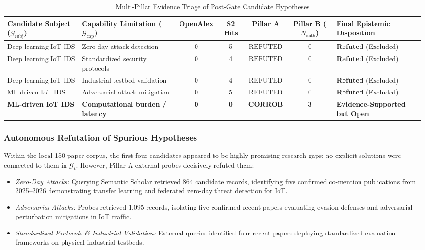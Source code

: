 \documentclass[conference,10pt]{IEEEtran}
\begin{document}
\begin{table}[t]
\caption{Multi-Pillar Evidence Triage of Post-Gate Candidate Hypotheses}
\label{tab:pillar_triage}
\centering
\small
\begin{tabularx}{\textwidth}{>{\raggedright\arraybackslash}p{3.2cm} >{\raggedright\arraybackslash}X cccc >{\raggedright\arraybackslash}p{3.2cm}}
\toprule
\textbf{Candidate Subject ($\mathcal{G}_{\text{subj}}$)} & \textbf{Capability Limitation ($\mathcal{G}_{\text{cap}}$)} & \textbf{OpenAlex} & \textbf{S2 Hits} & \textbf{Pillar A} & \textbf{Pillar B ($N_{\text{auth}}$)} & \textbf{Final Epistemic Disposition} \\
\midrule
Deep learning IoT IDS & Zero-day attack detection & 0 & 5 & $\mathrm{REFUTED}$ & 0 & \textbf{Refuted} (Excluded) \\
Deep learning IoT IDS & Standardized security protocols & 0 & 4 & $\mathrm{REFUTED}$ & 0 & \textbf{Refuted} (Excluded) \\
Deep learning IoT IDS & Industrial testbed validation & 0 & 4 & $\mathrm{REFUTED}$ & 0 & \textbf{Refuted} (Excluded) \\
ML-driven IoT IDS & Adversarial attack mitigation & 0 & 5 & $\mathrm{REFUTED}$ & 0 & \textbf{Refuted} (Excluded) \\
\midrule
\textbf{ML-driven IoT IDS} & \textbf{Computational burden / latency} & \textbf{0} & \textbf{0} & $\mathbf{CORROB}$ & \textbf{3} & \textbf{Evidence-Supported but Open} \\
\bottomrule
\end{tabularx}
\end{table}

\subsubsection{Autonomous Refutation of Spurious Hypotheses}
Within the local 150-paper corpus, the first four candidates appeared to be highly promising research gaps; no explicit solutions were connected to them in $\mathcal{G}_t$. However, Pillar A external probes decisively refuted them:
\begin{itemize}[leftmargin=1.5em]
  \item \emph{Zero-Day Attacks:} Querying Semantic Scholar retrieved 864 candidate records, identifying five confirmed co-mention publications from 2025--2026 demonstrating transfer learning and federated zero-day threat detection for IoT.
  \item \emph{Adversarial Attacks:} Probes retrieved 1,095 records, isolating five confirmed recent papers evaluating evasion defenses and adversarial perturbation mitigations in IoT traffic.
  \item \emph{Standardized Protocols \& Industrial Validation:} External queries identified four recent papers deploying standardized evaluation frameworks on physical industrial testbeds.
\end{itemize}
\end{document}
